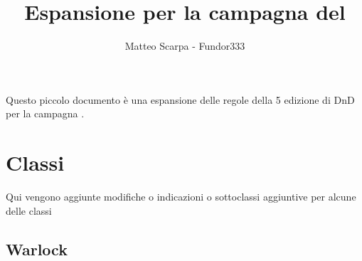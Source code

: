 \documentclass[10pt,twoside,twocolumn,openany,nodeprecatedcode]{dndbook}
\title{Espansione per la campagna del \nomecampagna}
\author{Matteo Scarpa - Fundor333}
\date{ }
\begin{document}
\maketitle

\tableofcontents


Questo piccolo documento è una espansione delle regole della 5 edizione di DnD per la campagna \nomecampagna.

\chapter{Classi}

Qui vengono aggiunte modifiche o indicazioni o sottoclassi aggiuntive per alcune delle classi

\section{Warlock}

 
\end{document}

